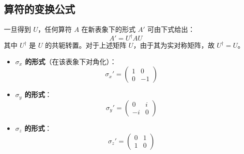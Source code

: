 \subsection*{算符的变换公式}
一旦得到 $U$，任何算符 $A$ 在新表象下的形式 $A'$ 可由下式给出：
\[ A' = U^\dagger A U \]
其中 $U^\dagger$ 是 $U$ 的共轭转置。对于上述矩阵 $U$，由于其为实对称矩阵，故 $U^\dagger = U$。
\begin{itemize}
	\item \textbf{$\sigma_x$ 的形式}（在该表象下对角化）：
	\[ \sigma_x' = \begin{pmatrix} 1 & 0 \\ 0 & -1 \end{pmatrix} \]
	
	\item \textbf{$\sigma_y$ 的形式}：
	\[ \sigma_y' = \begin{pmatrix} 0 & i \\ -i & 0 \end{pmatrix} \]
	
	\item \textbf{$\sigma_z$ 的形式}：
	\[ \sigma_z' = \begin{pmatrix} 0 & 1 \\ 1 & 0 \end{pmatrix} \]
\end{itemize}